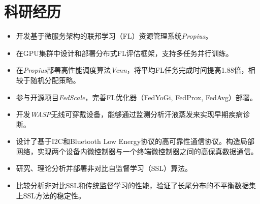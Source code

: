 \documentclass{resume}
\begin{document}

\section{科研经历}
\begin{itemize}
  \item 开发基于微服务架构的联邦学习（FL）资源管理系统\emph{Propius}。
  \item 在GPU集群中设计和部署分布式FL评估框架，支持多任务并行训练。
  \item 在\emph{Propius}部署高性能调度算法\emph{Venn}，将平均FL任务完成时间提高1.88倍，相较于随机分配策略。
  \item 参与开源项目\emph{FedScale}，完善FL优化器（FedYoGi, FedProx, FedAvg）部署。
\end{itemize}

\begin{itemize}
  \item 开发\emph{WASP}无线可穿戴设备，能够通过监测分析汗液蒸发来实现早期疾病诊断。
  \item 设计了基于I2C和Bluetooth Low Energy协议的高可靠性通信协议。构造局部网络，实现两个设备内微控制器与一个终端微控制器之间的高保真数据通信。
\end{itemize}

\begin{itemize}
  \item 研究、理论分析并部署非对比自监督学习（SSL）算法。
  \item 比较分析非对比SSL和传统监督学习的性能，验证了长尾分布的不平衡数据集上SSL方法的稳定性。
\end{itemize}


\end{document}
